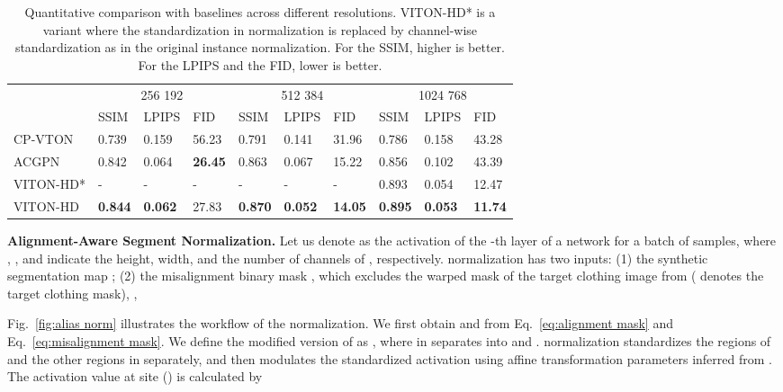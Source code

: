 \begin{table*}[t!]
\centering
\small
\begin{tabular}{@{}p{} p{}<{\centering} p{}<{\centering} p{}<{\centering} | p{}<{\centering} p{}<{\centering} p{}<{\centering} | p{}<{\centering} p{}<{\centering} p{}<{\centering}@{}}
    \toprule
    & \multicolumn{3}{c}{256  192} & \multicolumn{3}{c}{512  384} & \multicolumn{3}{c}{1024  768} \\
    & SSIM & LPIPS & FID & SSIM & LPIPS & FID & SSIM & LPIPS & FID \\
    \midrule
    CP-VTON & 0.739 & 0.159 & 56.23 & 0.791 & 0.141 & 31.96 & 0.786 & 0.158 & 43.28 \\
    ACGPN & 0.842 & 0.064 & \textbf{26.45} & 0.863 & 0.067 & 15.22 & 0.856 & 0.102 & 43.39 \\
    \midrule
    VITON-HD*  & - & - & - & - & - & - & 0.893 & 0.054 & 12.47 \\
    VITON-HD & \textbf{0.844} & \textbf{0.062} & 27.83 & \textbf{0.870} & \textbf{0.052} & \textbf{14.05} & \textbf{0.895} & \textbf{0.053} & \textbf{11.74} \\
    \bottomrule
    \end{tabular}
    \vspace{-0.2cm}
    \caption{Quantitative comparison with baselines across different resolutions. 
    VITON-HD* is a \model variant where the standardization in \norm normalization is replaced by channel-wise standardization as in the original instance normalization.
    For the SSIM, higher is better. For the LPIPS and the FID, lower is better.}
    \label{Table:resolution comparison}
    \vspace{-0.4cm}
\end{table*}

\textbf{Alignment-Aware Segment Normalization.}
Let us denote  as the activation of the -th layer of a network for a batch of  samples, where , , and  indicate the height, width, and the number of channels of , respectively. 
\norm normalization has two inputs:
(1) the synthetic segmentation map ;
(2) the misalignment binary mask , which excludes the warped mask of the target clothing image  from  ( denotes the target clothing mask), \ie,



Fig.~\ref{fig:alias norm} illustrates the workflow of the \norm normalization.
We first obtain  and  from Eq.~\eqref{eq:alignment mask} and Eq.~\eqref{eq:misalignment mask}.
We define the modified version of  as , where  in  separates into  and .
\norm normalization standardizes the regions of  and the other regions in  separately, and then modulates the standardized activation using affine transformation parameters inferred from .
The activation value at site () is calculated by

